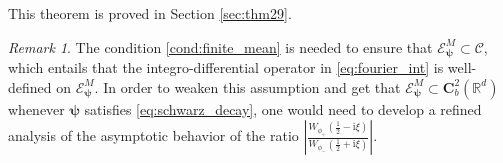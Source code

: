 \documentclass[12pt]{amsart}
\numberwithin{equation}{section}
\newcommand{\bb}{\mathbb}
\newcommand{\cc}{\mathcal}
\newcommand{\AM}{\bm{A}^M}
\newcommand{\Wphip}{W_{\phi_+}\left(\frac{1}{2}-\i\xi\right)}
\newcommand{\Wphim}{W_{\phi_-}\left(\frac{1}{2}+\i\xi\right)}
\newcommand{\C}{\mathbf{C}}
\renewcommand{\i}{\mathrm{i}}
\theoremstyle{definition}
\theoremstyle{assump}
\theoremstyle{remark}
\newtheorem{rem}[thm]{Remark}
\begin{document}
This theorem is proved in Section \ref{sec:thm29}.
\begin{rem}
	The condition \eqref{cond:finite_mean} is needed to ensure that $\bm{\cc{E}}^M_{\bm \psi}\subset\bm{\cc C}$, which entails that the integro-differential operator in \eqref{eq:fourier_int} is well-defined on $\bm{\cc{E}}^M_{\bm \psi}$. In order to weaken this assumption and get that $\bm{\cc{E}}^M_{\bm \psi}\subset\C^2_b(\bb R^d)$ whenever $\bm{\psi}$ satisfies \eqref{eq:schwarz_decay}, one would need to develop a refined analysis of the asymptotic behavior of the ratio $\left|\frac{\Wphip}{\Wphim}\right|$.
\end{rem}
\end{document}
